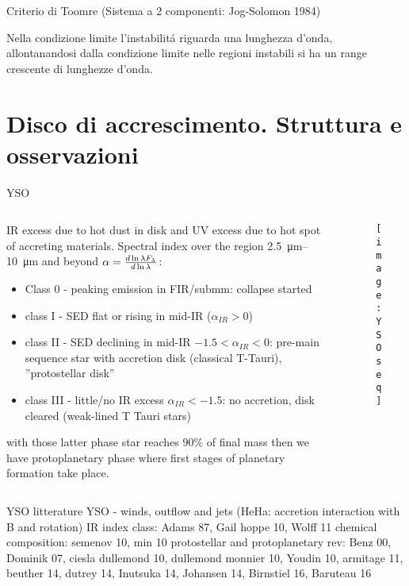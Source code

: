 \begin{wordonframe}{Criterio di Toomre}
(Sistema a 2 componenti: Jog-Solomon 1984)

Nella condizione limite l'instabilit\'a riguarda una lunghezza d'onda, allontanandosi dalla condizione limite nelle regioni instabili si ha un range crescente di lunghezze d'onda.

\end{wordonframe}

\section{Disco di accrescimento. Struttura e osservazioni}

\begin{frame}{YSO}
\begin{columns}[T]\begin{column}{0.5\textwidth}
IR excess due to hot dust in disk and UV excess due to hot spot of accreting materials. Spectral index over the region \SIrange{2.5}{10}{\micro\meter} and beyond $\alpha=\frac{d \ln{\lambda F_{\lambda}}}{d \ln{\lambda}}$: \begin{itemize}
\item Class 0 - peaking emission in FIR/submm: collapse started
\item class I - SED flat or rising in mid-IR ($\alpha_{IR}>0$)
\item class II - SED declining in mid-IR $-1.5<\alpha_{IR}<0$: pre-main sequence star with accretion disk (classical T-Tauri), ''protostellar disk''
\item class III - little/no IR excess $\alpha_{IR}<-1.5$: no accretion, disk cleared (weak-lined T Tauri stars)
\end{itemize}
with those latter phase star reaches $90\%$ of final mass then we have protoplanetary phase where first stages of planetary formation take place.
\end{column}\begin{column}{0.5\textwidth}
\begin{figure}[!ht]\texttt{[image: YSOseq]}\label{fig:YSOseq}\end{figure} 
\end{column}\end{columns}
\end{frame}

\begin{wordonframe}{YSO litterature}
YSO - winds, outflow and jets (HeHa: accretion interaction with B and rotation)
IR index class: Adams 87, Gail hoppe 10, Wolff 11
chemical composition: semenov 10, min 10
protostellar and protoplanetary rev: Benz 00, Dominik 07, ciesla dullemond 10, dullemond monnier 10, Youdin 10, armitage 11, beuther 14, dutrey 14, Inutsuka 14, Johansen 14, Birnstiel 16, Baruteau 16
\end{wordonframe}

